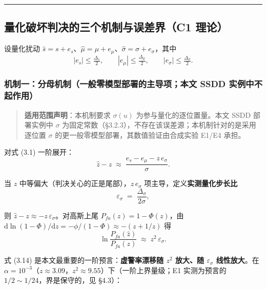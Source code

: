 \begin{center}\rule{0.5\linewidth}{0.5pt}\end{center}

\subsection{量化破坏判决的三个机制与误差界（C1
理论）}\label{ux91cfux5316ux7834ux574fux5224ux51b3ux7684ux4e09ux4e2aux673aux5236ux4e0eux8befux5deeux754cc1-ux7406ux8bba}

设量化扰动
\(\hat{s}=s+e_s\)、\(\hat{\mu}=\mu+e_\mu\)、\(\hat{\sigma}=\sigma+e_\sigma\)，其中
\[
|e_s|\le\tfrac{\Delta_s}{2},\qquad |e_\mu|\le\tfrac{\Delta_\mu}{2},\qquad |e_\sigma|\le\tfrac{\Delta_\sigma}{2}.
\tag{3.11}
\]

\subsubsection{机制一：分母机制（一般零模型部署的主导项；本文 SSDD
实例中不起作用）}\label{ux673aux5236ux4e00ux5206ux6bcdux673aux5236ux4e00ux822cux96f6ux6a21ux578bux90e8ux7f72ux7684ux4e3bux5bfcux9879ux672cux6587-ssdd-ux5b9eux4f8bux4e2dux4e0dux8d77ux4f5cux7528}

\begin{quote}
\textbf{适用范围声明}：本机制要求 \(\sigma(u)\)
为参与量化的逐位置量。本文 SSDD 部署实例中 \(\sigma\)
为固定常数（§3.2.3），不存在该误差源；本机制针对的是采用逐位置
\(\sigma\) 的更一般零模型部署，其数值验证由合成实验 E1/E4 承担。
\end{quote}

对式 (3.1) 一阶展开： \[
\hat{z}-z \;\approx\; \frac{e_s-e_\mu-z\,e_\sigma}{\sigma}.
\tag{3.12}
\]

当 \(z\) 中等偏大（判决关心的正是尾部），\(z\,e_\sigma\)
项主导，定义\textbf{实测量化步长比} \[
\varepsilon_\sigma \;=\; \frac{\Delta_\sigma}{2\sigma},
\tag{3.13}
\]

则 \(\hat z-z\approx -z\,\varepsilon_\sigma\)。对高斯上尾
\(P_{fa}(z)=1-\Phi(z)\)，由
\(\mathrm{d}\ln(1-\Phi)/\mathrm{d}z=-\phi/(1-\Phi)\approx-(z+1/z)\) 得
\[
\ln\frac{P_{fa}(\hat z)}{P_{fa}(z)} \;\approx\; z^{2}\,\varepsilon_\sigma .
\tag{3.14}
\]

式 (3.14) 是本文最重要的一阶预言：\textbf{虚警率漂移随 \(z^2\) 放大、随
\(\varepsilon_\sigma\) 线性放大}。在
\(\alpha=10^{-3}\)（\(z\approx 3.09\)，\(z^2\approx 9.55\)）下（一阶上界量级；E1
实测为预言的 \(1/2\sim1/24\)，界是保守的，见 §4.3）：

